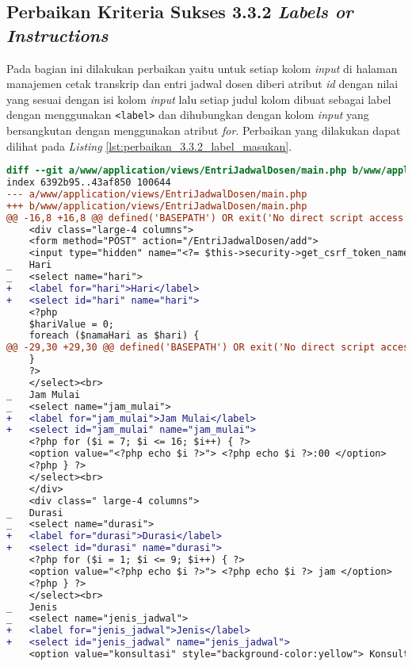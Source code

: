 \subsection{Perbaikan Kriteria Sukses 3.3.2 \textit{Labels or Instructions}}
\label{subsec:perbaikan_kriteria_sukses_3.3.2}
Pada bagian ini dilakukan perbaikan yaitu untuk setiap kolom \textit{input} di halaman manajemen cetak transkrip dan entri jadwal dosen diberi atribut \textit{id} dengan nilai yang sesuai dengan isi kolom \textit{input} lalu setiap judul kolom dibuat sebagai label dengan menggunakan \texttt{<label>} dan dihubungkan dengan kolom \textit{input} yang bersangkutan dengan menggunakan atribut \textit{for}. Perbaikan yang dilakukan dapat dilihat pada \textit{Listing} \ref{lst:perbaikan_3.3.2_label_masukan}.

\begin{lstlisting}[frame=single, label={lst:perbaikan_3.3.2_label_masukan}, language=diff, caption=Perbaikan Kriteria Sukses 3.3.2]
diff --git a/www/application/views/EntriJadwalDosen/main.php b/www/application/views/EntriJadwalDosen/main.php
index 6392b95..43af850 100644
--- a/www/application/views/EntriJadwalDosen/main.php
+++ b/www/application/views/EntriJadwalDosen/main.php
@@ -16,8 +16,8 @@ defined('BASEPATH') OR exit('No direct script access allowed');
    <div class="large-4 columns">
    <form method="POST" action="/EntriJadwalDosen/add">
    <input type="hidden" name="<?= $this->security->get_csrf_token_name() ?>" value="<?= $this->security->get_csrf_hash() ?>" />
_   Hari
_   <select name="hari"> 
+   <label for="hari">Hari</label>
+   <select id="hari" name="hari"> 
    <?php
    $hariValue = 0;
    foreach ($namaHari as $hari) {
@@ -29,30 +29,30 @@ defined('BASEPATH') OR exit('No direct script access allowed');
    }
    ?>
    </select><br>
_   Jam Mulai
_   <select name="jam_mulai"> 
+   <label for="jam_mulai">Jam Mulai</label>
+   <select id="jam_mulai" name="jam_mulai">  
    <?php for ($i = 7; $i <= 16; $i++) { ?>
    <option value="<?php echo $i ?>"> <?php echo $i ?>:00 </option>
    <?php } ?>
    </select><br>
    </div>
    <div class=" large-4 columns">
_   Durasi
_   <select name="durasi"> 
+   <label for="durasi">Durasi</label>
+   <select id="durasi" name="durasi">  
    <?php for ($i = 1; $i <= 9; $i++) { ?>
    <option value="<?php echo $i ?>"> <?php echo $i ?> jam </option>
    <?php } ?>
    </select><br>
_   Jenis  
_   <select name="jenis_jadwal"> 
+   <label for="jenis_jadwal">Jenis</label>
+   <select id="jenis_jadwal" name="jenis_jadwal">  
    <option value="konsultasi" style="background-color:yellow"> Konsultasi </option>

\end{lstlisting}
